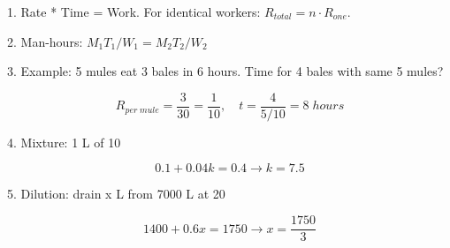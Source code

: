 1. Rate * Time = Work. For identical workers: $R_{total} = n \cdot R_{one}$.

2. Man-hours: $M_1 T_1 / W_1 = M_2 T_2 / W_2$

3. Example: 5 mules eat 3 bales in 6 hours. Time for 4 bales with same 5 mules?

$$ R_{per \; mule} = \frac{3}{30} = \frac{1}{10}, \quad t = \frac{4}{5/10} = 8 \; hours $$

4. Mixture: 1 L of 10%

$$ 0.1 + 0.04k = 0.4 \rightarrow k = 7.5 $$

5. Dilution: drain x L from 7000 L at 20%

$$ 1400+0.6x = 1750 \rightarrow x = \frac{1750}{3} $$
